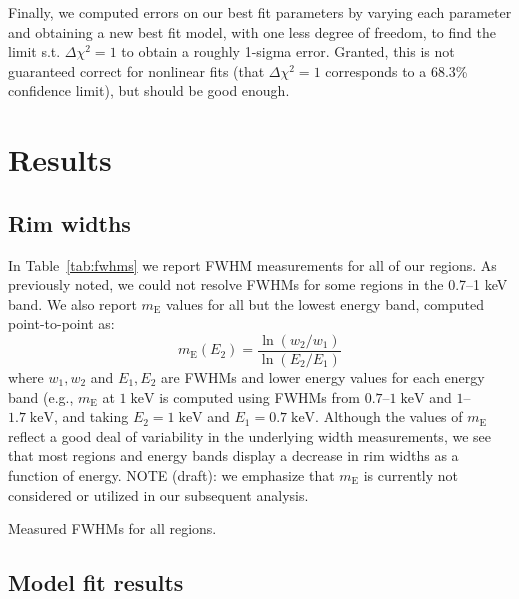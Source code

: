 \documentclass[iop, apj, numberedappendix, twocolappendix]{emulateapj}
\newcommand*{\mt}{\mathrm}
\newcommand*{\unit}[1]{\;\mt{#1}}  %
\newcommand*{\mE}{m_\mt{E}}
\begin{document}
Finally, we computed errors on our best fit parameters by varying each
parameter and obtaining a new best fit model, with one less degree of freedom,
to find the limit s.t. $\Delta \chi^2 = 1$ to obtain a roughly 1-sigma error.
Granted, this is not guaranteed correct for nonlinear fits (that $\Delta \chi^2
= 1$ corresponds to a $68.3$\% confidence limit), but should be good enough.

\section{Results}

\subsection{Rim widths}
\label{sec:fwhm-results}

In Table~\ref{tab:fwhms} we report FWHM measurements for all of our regions.
As previously noted, we could not resolve FWHMs for some regions in the 0.7--1
keV band.  We also report $\mE$ values for all but the lowest energy band,
computed point-to-point as: \begin{equation} \mE(E_2) =
\frac{\ln(w_2/w_1)}{\ln(E_2/E_1)} \end{equation} where $w_1, w_2$ and $E_1,
E_2$ are FWHMs and lower energy values for each energy band (e.g., $\mE$ at $1
\unit{keV}$ is computed using FWHMs from $0.7$--$1 \unit{keV}$ and $1$--$1.7
\unit{keV}$, and taking $E_2 = 1 \unit{keV}$ and $E_1 = 0.7 \unit{keV}$.
Although the values of $\mE$ reflect a good deal of variability in the
underlying width measurements, we see that most regions and energy bands
display a decrease in rim widths as a function of energy.  NOTE (draft): we
emphasize that $\mE$ is currently not considered or utilized in our subsequent
analysis.

\begin{table*}[ht]
    \tiny
    \centering
    \caption{Measured FWHMs for all regions.\label{tab:fwhms}}
    
\end{table*}

\subsection{Model fit results}
\label{sec:fit-results}
\end{document}

